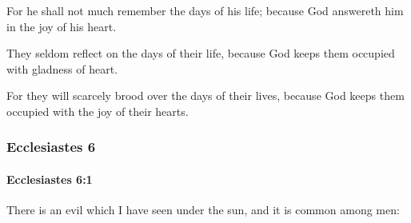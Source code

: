 			\begin{versebox}
					\item[BHS] 
					\item[LXX] 
					\item[ASV] For he shall not much remember the days of his life; because God answereth him in the joy of his heart.
					\item[NIV] They seldom reflect on the days of their life, because God keeps them occupied with gladness of heart.
					\item[NRSV] For they will scarcely brood over the days of their lives, because God keeps them occupied with the joy of their hearts.
			\end{versebox}
	\subsubsection{Ecclesiastes 6} %
		\label{ECCLESIASTES-6}

		\paragraph{Ecclesiastes 6:1} %
			\label{ECCLESIASTES-6-1}

			There is an evil which I have seen under the sun, and it is common among men:

